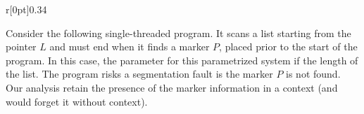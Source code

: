 %
\begin{wrapfigure}{r}[0pt]{0.34\linewidth}
  \vspace{-28pt}%
  \hfill%
  
  \vspace{-28pt}%
\end{wrapfigure}
%
Consider the following single-threaded program. It scans a list
starting from the pointer $L$ and must end when it finds a marker $P$,
placed prior to the start of the program. %
In this case, the parameter for this parametrized system if the length
of the list.
%
The program risks a segmentation fault is the marker $P$ is not
found. Our analysis retain the presence of the marker information in a
context (and would forget it without context).
%

\begin{center}
  \begin{tikzpicture}
    
  \end{tikzpicture}
\end{center}
